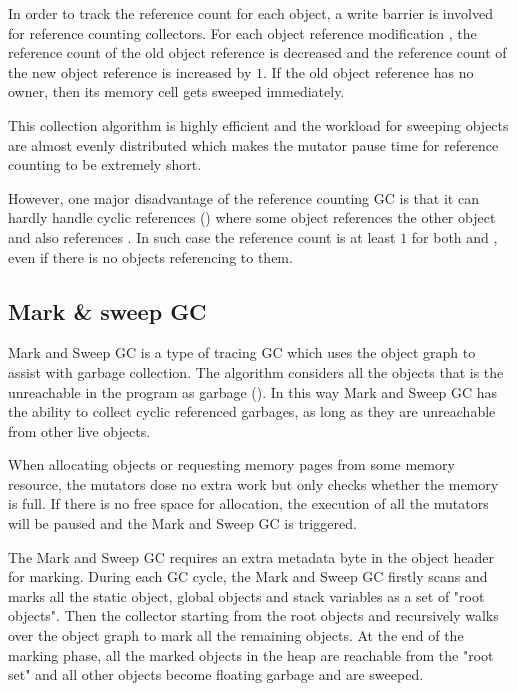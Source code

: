 In order to track the reference count for each object, a write barrier is involved
for reference counting collectors.
For each object reference modification , the reference count of
the old object reference is decreased and the reference count of the new object reference
is increased by $1$. If the old object reference has no owner, then its memory cell gets sweeped immediately.

This collection algorithm is highly efficient and the workload for sweeping objects are
almost evenly distributed which makes the mutator pause time for reference counting
to be extremely short.

However, one major disadvantage of the reference counting GC is that it can hardly
handle cyclic references (\cite{lins1992cyclic}) where some object  references the other object
 and  also references . In such case the reference
count is at least $1$ for both  and , even if there is no
objects referencing to them.

\subsection{Mark \& sweep GC}

Mark and Sweep GC is a type of tracing GC which uses the object graph to assist with garbage collection.
The algorithm considers all the objects that is the unreachable in the program as garbage (\cite{endo1997scalable}).
In this way Mark and Sweep GC has the ability to collect cyclic referenced garbages,
as long as they are unreachable from other live objects.


When allocating objects or requesting memory pages from some memory resource,
the mutators dose no extra work but only checks whether the memory is full.
If there is no free space for allocation, the execution of all the mutators will be
paused and the Mark and Sweep GC is triggered.

The Mark and Sweep GC requires an extra metadata byte in the object header for marking.
During each GC cycle, the Mark and Sweep GC firstly scans and marks all the static object,
global objects and stack variables as a set of "root objects".
Then the collector starting from the root objects and recursively walks over the
object graph to mark all the remaining objects. At the end of the marking phase,
all the marked objects in the heap are reachable from the "root set" and all other
objects become floating garbage and are sweeped.

